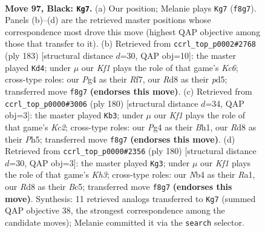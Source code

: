 \documentclass[11pt]{article}
\begin{document}
\clearpage

\begin{figure}[p]\centering
\begin{subfigure}{0.46\textwidth}\centering
\resizebox{\linewidth}{!}{%
\newchessgame
\chessboard[
  setfen={3r1k2/5p2/6p1/4P3/bnB2Ppp/1N6/6KP/8 b - - 9 97},
  showmover=false,
  pgfstyle=straightmove, color=movearrow, markmove={f8-g7}
]}
\caption{}
\end{subfigure}\hfill
\begin{subfigure}{0.46\textwidth}\centering
\resizebox{\linewidth}{!}{%
\newchessgame
\chessboard[
  setfen={8/5r2/3p4/3Pp2p/4P2P/2kb1BK1/R7/8 b - - 82 92},
  showmover=false,
  pgfstyle=straightmove, color=movearrow, markmove={c3-d4}
]}
\caption{}
\end{subfigure}
\\[4pt]
\begin{subfigure}{0.46\textwidth}\centering
\resizebox{\linewidth}{!}{%
\newchessgame
\chessboard[
  setfen={8/6p1/2pk3p/p3b2P/P5P1/2P5/2K5/7B w - - 9 91},
  showmover=false,
  pgfstyle=straightmove, color=movearrow, markmove={c2-b3}
]}
\caption{}
\end{subfigure}\hfill
\begin{subfigure}{0.46\textwidth}\centering
\resizebox{\linewidth}{!}{%
\newchessgame
\chessboard[
  setfen={8/1p3p2/2b1p3/p1B1P2k/P4P2/7K/3b4/R7 w - - 4 91},
  showmover=false,
  pgfstyle=straightmove, color=movearrow, markmove={h3-g3}
]}
\caption{}
\end{subfigure}
\caption{\textbf{Move 97, Black: \texttt{Kg7}.} (a) Our position; Melanie plays \texttt{Kg7} (\texttt{f8g7}). Panels (b)--(d) are the retrieved master positions whose correspondence most drove this move (highest QAP objective among those that transfer to it). (b) Retrieved from \texttt{ccrl\_top\_p0002\#2768} (ply 183) [structural distance $d$=30, QAP obj=10]: the master played \texttt{Kd4}; under $\mu$ our \emph{Kf1} plays the role of that game's \emph{Kc6}; cross-type roles: our \emph{P}g4 as their \emph{R}f7, our \emph{R}d8 as their \emph{p}d5; transferred move \texttt{f8g7} \textbf{(endorses this move)}. (c) Retrieved from \texttt{ccrl\_top\_p0000\#3006} (ply 180) [structural distance $d$=34, QAP obj=3]: the master played \texttt{Kb3}; under $\mu$ our \emph{Kf1} plays the role of that game's \emph{Kc2}; cross-type roles: our \emph{P}g4 as their \emph{B}h1, our \emph{R}d8 as their \emph{P}h5; transferred move \texttt{f8g7} \textbf{(endorses this move)}. (d) Retrieved from \texttt{ccrl\_top\_p0000\#2356} (ply 180) [structural distance $d$=30, QAP obj=3]: the master played \texttt{Kg3}; under $\mu$ our \emph{Kf1} plays the role of that game's \emph{Kh3}; cross-type roles: our \emph{N}b4 as their \emph{R}a1, our \emph{R}d8 as their \emph{B}c5; transferred move \texttt{f8g7} \textbf{(endorses this move)}. Synthesis: 11 retrieved analogs transferred to \texttt{Kg7} (summed QAP objective 38, the strongest correspondence among the candidate moves); Melanie committed it via the \texttt{search} selector.}
\label{fig:thought-m193}
\end{figure}
\end{document}
